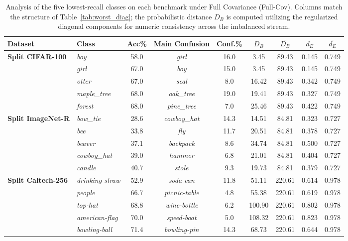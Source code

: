 \begin{table}[htbp]
	\centering
	\small
	\caption{Analysis of the five lowest-recall classes on each benchmark under Full Covariance (Full-Cov). Columns match the structure of Table~\ref{tab:worst_diag}; the probabilistic distance $D_B$ is computed utilizing the regularized diagonal components for numeric consistency across the imbalanced stream.}
	\label{tab:worst_full}
	\begin{adjustbox}{width=0.95\columnwidth, center}
		\small
		\begin{tabular}{llccccccc}
			\toprule
			\textbf{Dataset} & \textbf{Class} & \textbf{Acc\%} & \textbf{Main Confusion} & \textbf{Conf.\%} & $D_B$ & $\overline{D_B}$ & $d_E$ & $\overline{d_E}$ \\
			\midrule
			\textbf{Split CIFAR-100}
			& \textit{boy}          & 58.0 & \textit{girl}       & 16.0 &   3.45 & 89.43 & 0.145 & 0.749 \\
			& \textit{girl}         & 67.0 & \textit{boy}        & 15.0 &   3.45 & 89.43 & 0.145 & 0.749 \\
			& \textit{otter}        & 67.0 & \textit{seal}       &  8.0 & 16.42 & 89.43 & 0.342 & 0.749 \\
			& \textit{maple\_tree} & 68.0 & \textit{oak\_tree}  & 19.0 & 19.41 & 89.43 & 0.327 & 0.749 \\
			& \textit{forest}       & 68.0 & \textit{pine\_tree} &  7.0 & 25.46 & 89.43 & 0.422 & 0.749 \\
			\midrule
			\textbf{Split ImageNet-R}
			& \textit{bow\_tie}    & 28.6 & \textit{cowboy\_hat} & 14.3 & 14.51 & 84.81 & 0.323 & 0.727 \\
			& \textit{bee}          & 33.8 & \textit{fly}        & 11.7 & 20.51 & 84.81 & 0.378 & 0.727 \\
			& \textit{beaver}       & 37.1 & \textit{backpack}   &  8.6 & 34.74 & 84.81 & 0.500 & 0.727 \\
			& \textit{cowboy\_hat} & 39.0 & \textit{hammer}     &  6.8 & 21.01 & 84.81 & 0.404 & 0.727 \\
			& \textit{candle}       & 40.7 & \textit{stole}      &  9.3 & 19.73 & 84.81 & 0.379 & 0.727 \\
			\midrule
			\textbf{Split Caltech-256}
			& \textit{drinking-straw}  & 52.9 & \textit{soda-can}     & 11.8 &  51.11 & 220.61 & 0.614 & 0.978 \\
			& \textit{people}          & 66.7 & \textit{picnic-table} &  4.8 &  55.38 & 220.61 & 0.619 & 0.978 \\
			& \textit{top-hat}          & 68.8 & \textit{wine-bottle}  &  6.2 & 100.90 & 220.61 & 0.802 & 0.978 \\
			& \textit{american-flag}   & 70.0 & \textit{speed-boat}   &  5.0 & 108.32 & 220.61 & 0.823 & 0.978 \\
			& \textit{bowling-ball}    & 71.4 & \textit{bowling-pin}  & 14.3 &  68.73 & 220.61 & 0.644 & 0.978 \\
			\bottomrule
		\end{tabular}
	\end{adjustbox}
\end{table}

